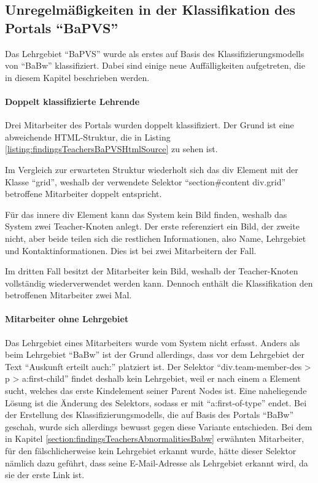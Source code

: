 \subsection{Unregelmäßigkeiten in der Klassifikation des Portals "`BaPVS"'}
    Das Lehrgebiet "`BaPVS"' wurde als erstes auf Basis des
    Klassifizierungsmodells von "`BaBw"' klassifiziert.
    Dabei sind einige neue Auffälligkeiten aufgetreten,
    die in diesem Kapitel beschrieben werden.

    \paragraph{Doppelt klassifizierte Lehrende}
    Drei Mitarbeiter des Portals wurden doppelt klassifiziert.
    Der Grund ist eine abweichende HTML-Struktur,
    die in Listing \ref{listing:findingsTeachersBaPVSHtmlSource} zu sehen ist.

    

    Im Vergleich zur erwarteten Struktur wiederholt sich
    das div Element mit der Klasse "`grid"',
    weshalb der verwendete Selektor "`section\#content div.grid"'
    betroffene Mitarbeiter doppelt entspricht.

    Für das innere div Element kann das System kein Bild finden,
    weshalb das System zwei Teacher-Knoten anlegt.
    Der erste referenziert ein Bild, der zweite nicht,
    aber beide teilen sich die restlichen Informationen,
    also Name, Lehrgebiet und Kontaktinformationen.
    Dies ist bei zwei Mitarbeitern der Fall.

    Im dritten Fall besitzt der Mitarbeiter kein Bild,
    weshalb der Teacher-Knoten vollständig wiederverwendet werden kann.
    Dennoch enthält die Klassifikation den betroffenen Mitarbeiter zwei Mal.

    \paragraph{Mitarbeiter ohne Lehrgebiet}
    Das Lehrgebiet eines Mitarbeiters wurde vom System nicht erfasst.
    Anders als beim Lehrgebiet "`BaBw"' ist der Grund allerdings,
    dass vor dem Lehrgebiet der Text "`Auskunft erteilt auch:"' platziert ist.
    Der Selektor "`div.team-member-des > p > a:first-child"' findet deshalb
    kein Lehrgebiet, weil er nach einem a Element sucht,
    welches das erste Kindelement seiner Parent Nodes ist.
    Eine naheliegende Lösung ist die Änderung des Selektors,
    sodass er mit "`a:first-of-type"' endet.
    Bei der Erstellung des Klassifizierungsmodells,
    die auf Basis des Portals "`BaBw"' geschah,
    wurde sich allerdings bewusst gegen diese Variante entschieden.
    Bei dem in Kapitel \ref{section:findingsTeachersAbnormalitiesBabw}
    erwähnten Mitarbeiter, für den fälschlicherweise kein Lehrgebiet erkannt wurde,
    hätte dieser Selektor nämlich dazu geführt,
    dass seine E-Mail-Adresse als Lehrgebiet erkannt wird,
    da sie der erste Link ist.

